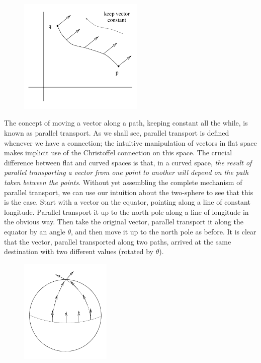 \documentclass[12pt]{article}
\begin{document}
\begin{figure}[h]
  \centerline{
  \includegraphics[height=5.5cm]{pdf/three2}}
\end{figure}

The concept of moving a vector along a path, keeping constant all
the while, is known as parallel transport.  As we shall see, parallel
transport is defined whenever we have a connection; the intuitive
manipulation of vectors in flat space makes implicit use of the
Christoffel connection on this space.  The crucial difference between
flat and curved spaces is that, in a curved space, {\it the result
of parallel transporting a vector from one point to another will
depend on the path taken between the points}.  Without yet assembling
the complete mechanism of parallel transport, we can use our 
intuition about the two-sphere to see that this is the case. Start
with a vector on the equator, pointing along a line of constant
longitude.  Parallel transport it up to the north pole along a line
of longitude in the
obvious way.  Then take the original vector, parallel transport it
along the equator by an angle $\theta$, and then move it up to the
north pole as before.
It is clear that the vector, parallel transported along two paths,
arrived at the same destination with two different values (rotated
by $\theta$).

\begin{figure}[h]
  \centerline{
  \includegraphics[height=5cm]{pdf/three3}}
\end{figure}
\end{document}
